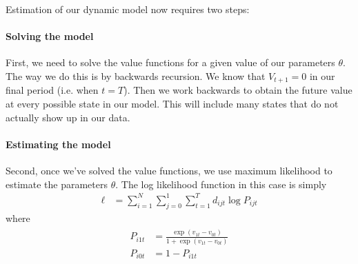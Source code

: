 \documentclass[12pt,english]{article}
\begin{document}
Estimation of our dynamic model now requires two steps:

\paragraph{Solving the model} First, we need to solve the value functions for a given value of our parameters $\theta$. The way we do this is by backwards recursion. We know that $V_{t+1} = 0$ in our final period (i.e. when $t=T$). Then we work backwards to obtain the future value at every possible state in our model. This will include many states that do not actually show up in our data.

\paragraph{Estimating the model} Second, once we've solved the value functions, we use maximum likelihood to estimate the parameters $\theta$. The log likelihood function in this case is simply
\begin{align}\label{eq:loglike}
    \ell &= \sum_{i=1}^N\sum_{j=0}^1\sum_{t=1}^Td_{ijt}\log P_{ijt}
\end{align}
where
\begin{align}\label{eq:ps}
\begin{split}
    P_{i1t} &= \frac{\exp\left( v_{1t}-v_{0t}\right)}{1+\exp\left(v_{1t}-v_{0t}\right)} \\
    P_{i0t} &= 1-P_{i1t}
\end{split}
\end{align}
\end{document}
